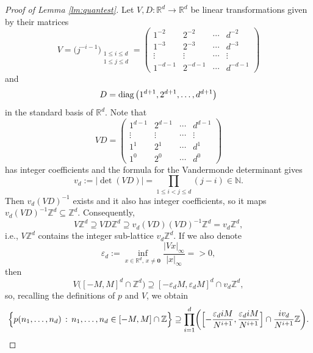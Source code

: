 \documentclass[11pt,letterpaper,reqno]{amsart}
\numberwithin{equation}{section}
\theoremstyle{definition}
\numberwithin{equation}{section}
\begin{document}
\begin{proof}[Proof of Lemma \ref{lm:quantest}]
Let $V,D\colon\mathbb{R}^d\to\mathbb{R}^d$ be linear transformations given by their matrices
\[ V = \big(j^{-i-1}\big)_{\substack{1\leqslant i\leqslant d\\ 1\leqslant j\leqslant d}}
= \begin{pmatrix} 1^{-2} & 2^{-2} & \cdots & d^{-2} \\
1^{-3} & 2^{-3} & \cdots & d^{-3} \\
\vdots & \vdots & \cdots & \vdots \\
1^{-d-1} & 2^{-d-1} & \cdots & d^{-d-1}
\end{pmatrix} \]
and
\[ D = \mathop{\textup{diag}}\big( 1^{d+1}, 2^{d+1}, \ldots, d^{d+1} \big) \]
in the standard basis of $\mathbb{R}^d$.
Note that
\[ VD = \begin{pmatrix} 1^{d-1} & 2^{d-1} & \cdots & d^{d-1} \\
\vdots & \vdots & \cdots & \vdots \\
1^{1} & 2^{1} & \cdots & d^{1} \\
1^{0} & 2^{0} & \cdots & d^{0}
\end{pmatrix} \]
has integer coefficients and the formula for the Vandermonde determinant gives
\[ v_d := |\det(VD)| = \prod_{1\leqslant i<j\leqslant d} (j-i) \in \mathbb{N}. \]
Then $v_d (VD)^{-1}$ exists and it also has integer coefficients, so it maps $v_d (VD)^{-1} \mathbb{Z}^d \subseteq \mathbb{Z}^d$.
Consequently,
\[ V\mathbb{Z}^d \supseteq VD\mathbb{Z}^d \supseteq v_d (VD) (VD)^{-1} \mathbb{Z}^d = v_d \mathbb{Z}^d, \]
i.e., $V\mathbb{Z}^d$ contains the integer sub-lattice $v_d \mathbb{Z}^d$.
If we also denote
\[ \varepsilon_d := \inf_{x\in\mathbb{R}^d,\,x\neq\mathbf{0}} \frac{|Vx|_{\infty}}{|x|_{\infty}} =  >0, \]
then
\[ V \big( [-M,M]^d \cap \mathbb{Z}^d \big) \supseteq[-\varepsilon_d M,\varepsilon_d M]^d \cap v_d\mathbb{Z}^d, \]
so, recalling the definitions of $p$ and $V$, we obtain
\begin{equation}\label{eq:pkcontains}
\Bigl\{ p(n_1,\ldots,n_d) \,:\, n_1,\ldots,n_d\in[-M,M]\cap\mathbb{Z} \Bigr\}
\supseteq \prod_{i=1}^{d} \biggl( \Bigl[-\frac{\varepsilon_d i M}{N^{i+1}},\frac{\varepsilon_d i M}{N^{i+1}}\Bigr] \cap \frac{i v_d}{N^{i+1}}\mathbb{Z} \biggr).
\end{equation}


\end{proof}
\end{document}
